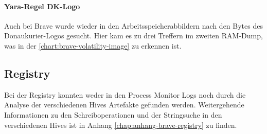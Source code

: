 
\begin{table}[h!]
	\caption{Brave: Anzahl gefundener Hexadezimalwerte des Donaukurier-Logos im RAM}
	\label{chart:brave-volatility-image}
\end{table}

\paragraph{Yara-Regel \glqq{}DK-Logo\grqq{}}\label{chap:ergebnisse-brave-uncommon-locations-volatility-dklogo} 

Auch bei Brave wurde wieder in den Arbeitsspeicherabbildern nach den Bytes des Donaukurier-Logos gesucht. Hier kam es zu drei Treffern im zweiten RAM-Dump, was in der \autoref{chart:brave-volatility-image} zu erkennen ist.


\subsection*{Registry}\label{chap:ergebnisse-brave-uncommon-locations-registry} 

Bei der Registry konnten weder in den Process Monitor Logs noch durch die Analyse der verschiedenen Hives Artefakte gefunden werden. Weitergehende Informationen zu den Schreiboperationen und der Stringsuche in den verschiedenen Hives ist in Anhang \ref{chap:anhang-brave-registry} zu finden.


